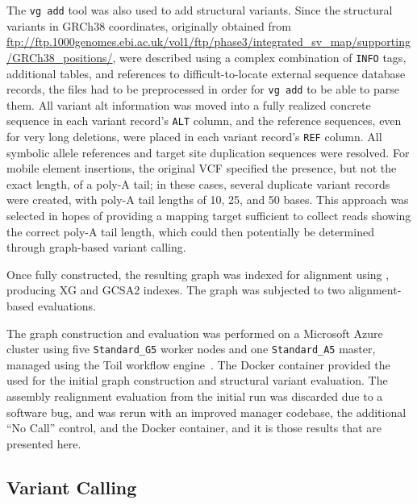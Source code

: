 The \texttt{vg add} tool was also used to add structural variants. Since the structural variants in GRCh38 coordinates, originally obtained from \url{ftp://ftp.1000genomes.ebi.ac.uk/vol1/ftp/phase3/integrated_sv_map/supporting/GRCh38_positions/}, were described using a complex combination of \texttt{INFO} tags, additional tables, and references to difficult-to-locate external sequence database records, the files had to be preprocessed in order for \texttt{vg add} to be able to parse them. All variant alt information was moved into a fully realized concrete sequence in each variant record's \texttt{ALT} column, and the reference sequences, even for very long deletions, were placed in each variant record's \texttt{REF} column. All symbolic allele references and target site duplication sequences were resolved. For mobile element insertions, the original VCF specified the presence, but not the exact length, of a poly-A tail; in these cases, several duplicate variant records were created, with poly-A tail lengths of 10, 25, and 50 bases. This approach was selected in hopes of providing a mapping target sufficient to collect reads showing the correct poly-A tail length, which could then potentially be determined through graph-based variant calling.

Once fully constructed, the resulting graph was indexed for alignment using \vg, producing XG and GCSA2 indexes. The graph was subjected to two alignment-based evaluations.

\begin{sloppypar}
The graph construction and evaluation was performed on a Microsoft Azure cluster using five \texttt{Standard\_G5} worker nodes and one \texttt{Standard\_A5} master, managed using the Toil workflow engine~\cite{vivian2017toil}. The  Docker container provided the \vg used for the initial graph construction and structural variant evaluation. The assembly realignment evaluation from the initial run was discarded due to a software bug, and was rerun with an improved manager codebase, the additional ``No Call'' control, and the  Docker container, and it is those results that are presented here.
\end{sloppypar}

\subsection{Variant Calling}

